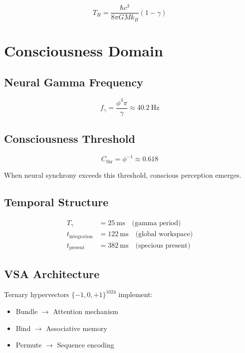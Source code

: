 \documentclass[12pt,a4paper]{article}
\begin{document}
\begin{equation}
T_H = \frac{\hbar c^3}{8\pi GM k_B}(1 - \gamma)
\end{equation}

\section{Consciousness Domain}

\subsection{Neural Gamma Frequency}

\begin{equation}
f_\gamma = \frac{\phi^3 \pi}{\gamma} \approx 40.2~\text{Hz}
\end{equation}

\subsection{Consciousness Threshold}

\begin{equation}
C_{\text{thr}} = \phi^{-1} \approx 0.618
\end{equation}

When neural synchrony exceeds this threshold, conscious perception emerges.

\subsection{Temporal Structure}

\begin{align}
T_\gamma &= 25~\text{ms} \quad \text{(gamma period)} \\
t_{\text{integration}} &= 122~\text{ms} \quad \text{(global workspace)} \\
t_{\text{present}} &= 382~\text{ms} \quad \text{(specious present)}
\end{align}

\subsection{VSA Architecture}

Ternary hypervectors $\{-1, 0, +1\}^{1024}$ implement:
\begin{itemize}
\item Bundle $\rightarrow$ Attention mechanism
\item Bind $\rightarrow$ Associative memory
\item Permute $\rightarrow$ Sequence encoding
\end{itemize}
\end{document}
